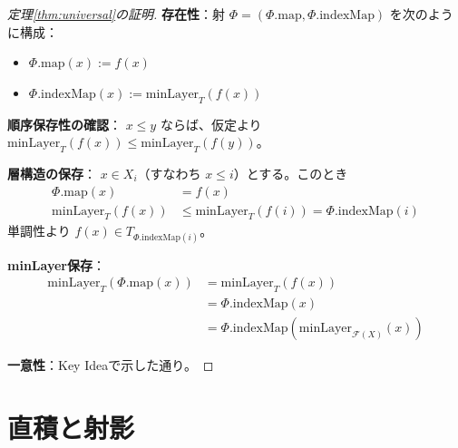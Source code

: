 \documentclass[a4paper,12pt]{ltjsarticle}
\theoremstyle{definition}
\begin{document}
\begin{proof}[定理\ref{thm:universal}の証明]
\textbf{存在性}：射 $\Phi = (\Phi.\mathrm{map}, \Phi.\mathrm{indexMap})$ を次のように構成：
\begin{itemize}
\item $\Phi.\mathrm{map}(x) := f(x)$
\item $\Phi.\mathrm{indexMap}(x) := \mathrm{minLayer}_T(f(x))$
\end{itemize}

\textbf{順序保存性の確認}：
$x \leq y$ ならば、仮定より $\mathrm{minLayer}_T(f(x)) \leq \mathrm{minLayer}_T(f(y))$。

\textbf{層構造の保存}：
$x \in X_i$（すなわち $x \leq i$）とする。このとき
\begin{align*}
\Phi.\mathrm{map}(x) &= f(x) \\
\mathrm{minLayer}_T(f(x)) &\leq \mathrm{minLayer}_T(f(i)) = \Phi.\mathrm{indexMap}(i)
\end{align*}
単調性より $f(x) \in T_{\Phi.\mathrm{indexMap}(i)}$。

\textbf{minLayer保存}：
\begin{align*}
\mathrm{minLayer}_T(\Phi.\mathrm{map}(x))
&= \mathrm{minLayer}_T(f(x)) \\
&= \Phi.\mathrm{indexMap}(x) \\
&= \Phi.\mathrm{indexMap}(\mathrm{minLayer}_{\mathcal{F}(X)}(x))
\end{align*}

\textbf{一意性}：Key Ideaで示した通り。
\end{proof}

\begin{center}
\end{center}

\section{直積と射影}
\end{document}
